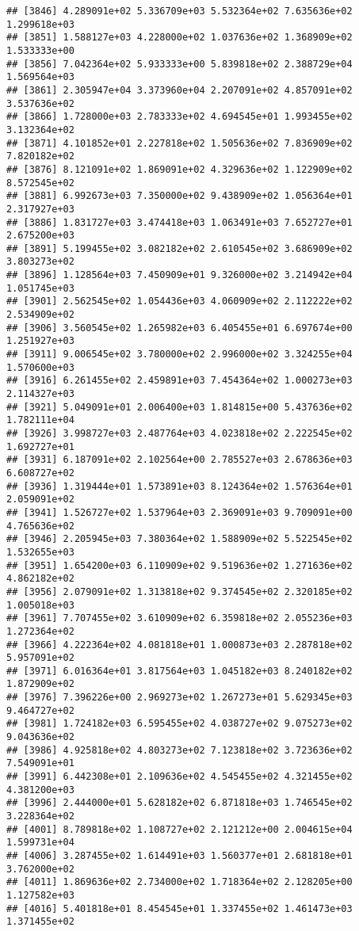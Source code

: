 \documentclass[]{article}
\begin{document}
\begin{verbatim}
## [3846] 4.289091e+02 5.336709e+03 5.532364e+02 7.635636e+02 1.299618e+03
## [3851] 1.588127e+03 4.228000e+02 1.037636e+02 1.368909e+02 1.533333e+00
## [3856] 7.042364e+02 5.933333e+00 5.839818e+02 2.388729e+04 1.569564e+03
## [3861] 2.305947e+04 3.373960e+04 2.207091e+02 4.857091e+02 3.537636e+02
## [3866] 1.728000e+03 2.783333e+02 4.694545e+01 1.993455e+02 3.132364e+02
## [3871] 4.101852e+01 2.227818e+02 1.505636e+02 7.836909e+02 7.820182e+02
## [3876] 8.121091e+02 1.869091e+02 4.329636e+02 1.122909e+02 8.572545e+02
## [3881] 6.992673e+03 7.350000e+02 9.438909e+02 1.056364e+01 2.317927e+03
## [3886] 1.831727e+03 3.474418e+03 1.063491e+03 7.652727e+01 2.675200e+03
## [3891] 5.199455e+02 3.082182e+02 2.610545e+02 3.686909e+02 3.803273e+02
## [3896] 1.128564e+03 7.450909e+01 9.326000e+02 3.214942e+04 1.051745e+03
## [3901] 2.562545e+02 1.054436e+03 4.060909e+02 2.112222e+02 2.534909e+02
## [3906] 3.560545e+02 1.265982e+03 6.405455e+01 6.697674e+00 1.251927e+03
## [3911] 9.006545e+02 3.780000e+02 2.996000e+02 3.324255e+04 1.570600e+03
## [3916] 6.261455e+02 2.459891e+03 7.454364e+02 1.000273e+03 2.114327e+03
## [3921] 5.049091e+01 2.006400e+03 1.814815e+00 5.437636e+02 1.782111e+04
## [3926] 3.998727e+03 2.487764e+03 4.023818e+02 2.222545e+02 1.692727e+01
## [3931] 6.187091e+02 2.102564e+00 2.785527e+03 2.678636e+03 6.608727e+02
## [3936] 1.319444e+01 1.573891e+03 8.124364e+02 1.576364e+01 2.059091e+02
## [3941] 1.526727e+02 1.537964e+03 2.369091e+03 9.709091e+00 4.765636e+02
## [3946] 2.205945e+03 7.380364e+02 1.588909e+02 5.522545e+02 1.532655e+03
## [3951] 1.654200e+03 6.110909e+02 9.519636e+02 1.271636e+02 4.862182e+02
## [3956] 2.079091e+02 1.313818e+02 9.374545e+02 2.320185e+02 1.005018e+03
## [3961] 7.707455e+02 3.610909e+02 6.359818e+02 2.055236e+03 1.272364e+02
## [3966] 4.222364e+02 4.081818e+01 1.000873e+03 2.287818e+02 5.957091e+02
## [3971] 6.016364e+01 3.817564e+03 1.045182e+03 8.240182e+02 1.872909e+02
## [3976] 7.396226e+00 2.969273e+02 1.267273e+01 5.629345e+03 9.464727e+02
## [3981] 1.724182e+03 6.595455e+02 4.038727e+02 9.075273e+02 9.043636e+02
## [3986] 4.925818e+02 4.803273e+02 7.123818e+02 3.723636e+02 7.549091e+01
## [3991] 6.442308e+01 2.109636e+02 4.545455e+02 4.321455e+02 4.381200e+03
## [3996] 2.444000e+01 5.628182e+02 6.871818e+03 1.746545e+02 3.228364e+02
## [4001] 8.789818e+02 1.108727e+02 2.121212e+00 2.004615e+04 1.599731e+04
## [4006] 3.287455e+02 1.614491e+03 1.560377e+01 2.681818e+01 3.762000e+02
## [4011] 1.869636e+02 2.734000e+02 1.718364e+02 2.128205e+00 1.127582e+03
## [4016] 5.401818e+01 8.454545e+01 1.337455e+02 1.461473e+03 1.371455e+02

\end{verbatim}
\end{document}
